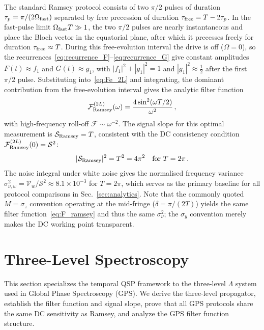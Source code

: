\documentclass[aps,pra,twocolumn,superscriptaddress,longbibliography]{revtex4-2}
\newcommand{\be}{\begin{equation}}
\newcommand{\ee}{\end{equation}}
\begin{document}
The standard Ramsey protocol consists of two $\pi/2$ pulses of duration
$\tau_p = \pi/(2\Omega_{\rm fast})$ separated by free precession of duration
$\tau_{\rm free} = T - 2\tau_p$.
In the fast-pulse limit $\Omega_{\rm fast} T \gg 1$, the two $\pi/2$ pulses are
nearly instantaneous and place the Bloch vector in the equatorial plane, after
which it precesses freely for duration $\tau_{\rm free}\approx T$.
During this free-evolution interval the drive is off ($\Omega=0$), so the
recurrences~\eqref{eq:recurrence_F}--\eqref{eq:recurrence_G} give constant amplitudes
$F(t)\approx f_1$ and $G(t)\approx g_1$, with $|f_1|^2+|g_1|^2=1$ and
$|g_1|^2\approx\tfrac{1}{2}$ after the first $\pi/2$ pulse.
Substituting into~\eqref{eq:Fe_2L} and integrating, the dominant contribution
from the free-evolution interval gives the analytic filter function
\be
  \mathcal{F}^{(2L)}_{\rm Ramsey}(\omega) = \frac{4\sin^2(\omega T/2)}{\omega^2}\,,
  \label{eq:F_ramsey}
\ee
with high-frequency roll-off $\mathcal{F}\sim\omega^{-2}$.
The signal slope for this optimal measurement is $\mathcal{S}_{\rm Ramsey} = T$,
consistent with the DC consistency condition $\mathcal{F}^{(2L)}_{\rm Ramsey}(0) = \mathcal{S}^2$:
\be
  |\mathcal{S}_{\rm Ramsey}|^2 = T^2 = 4\pi^2
  \quad \text{for } T=2\pi\,.
  \label{eq:ramsey_sens}
\ee
The noise integral under white noise gives the normalised frequency variance
$\sigma^2_{\nu,w} = \mathcal{V}_w/\mathcal{S}^2 \approx 8.1\times10^{-3}$
for $T=2\pi$, which serves as the primary baseline for all protocol comparisons in
Sec.~\ref{sec:analytics}.
Note that the commonly quoted $M{=}\sigma_z$ convention operating at the mid-fringe
($\delta = \pi/(2T)$) yields the same filter function~\eqref{eq:F_ramsey} and thus
the same $\sigma^2_\nu$; the $\sigma_y$ convention merely makes the DC working point
transparent.


\section{Three-Level Spectroscopy}
\label{sec:three_level}

This section specializes the temporal QSP framework to the three-level
$\Lambda$ system used in Global Phase Spectroscopy (GPS).
We derive the three-level propagator, establish the filter function and
signal slope, prove that all GPS protocols share the same DC sensitivity
as Ramsey, and analyze the GPS filter function structure.
\end{document}
